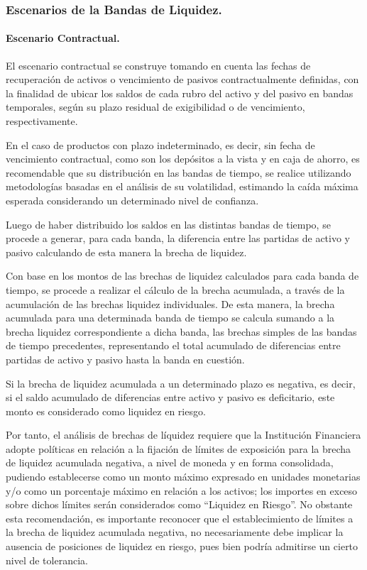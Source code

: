 \documentclass[10pt,]{article}
\begin{document}
\hypertarget{escenarios-de-la-bandas-de-liquidez.}{%
\subsubsection{Escenarios de la Bandas de
Liquidez.}\label{escenarios-de-la-bandas-de-liquidez.}}

\hypertarget{escenario-contractual.}{%
\paragraph{Escenario Contractual.}\label{escenario-contractual.}}

El escenario contractual se construye tomando en cuenta las fechas de
recuperación de activos o vencimiento de pasivos contractualmente
definidas, con la finalidad de ubicar los saldos de cada rubro del
activo y del pasivo en bandas temporales, según su plazo residual de
exigibilidad o de vencimiento, respectivamente.

En el caso de productos con plazo indeterminado, es decir, sin fecha de
vencimiento contractual, como son los depósitos a la vista y en caja de
ahorro, es recomendable que su distribución en las bandas de tiempo, se
realice utilizando metodologías basadas en el análisis de su
volatilidad, estimando la caída máxima esperada considerando un
determinado nivel de confianza.

Luego de haber distribuido los saldos en las distintas bandas de tiempo,
se procede a generar, para cada banda, la diferencia entre las partidas
de activo y pasivo calculando de esta manera la brecha de liquidez.

Con base en los montos de las brechas de liquidez calculados para cada
banda de tiempo, se procede a realizar el cálculo de la brecha
acumulada, a través de la acumulación de las brechas liquidez
individuales. De esta manera, la brecha acumulada para una determinada
banda de tiempo se calcula sumando a la brecha liquidez correspondiente
a dicha banda, las brechas simples de las bandas de tiempo precedentes,
representando el total acumulado de diferencias entre partidas de activo
y pasivo hasta la banda en cuestión.

Si la brecha de liquidez acumulada a un determinado plazo es negativa,
es decir, si el saldo acumulado de diferencias entre activo y pasivo es
deficitario, este monto es considerado como liquidez en riesgo.

Por tanto, el análisis de brechas de líquidez requiere que la
Institución Financiera adopte políticas en relación a la fijación de
límites de exposición para la brecha de liquidez acumulada negativa, a
nivel de moneda y en forma consolidada, pudiendo establecerse como un
monto máximo expresado en unidades monetarias y/o como un porcentaje
máximo en relación a los activos; los importes en exceso sobre dichos
límites serán considerados como ``Liquidez en Riesgo''. No obstante esta
recomendación, es importante reconocer que el establecimiento de límites
a la brecha de liquidez acumulada negativa, no necesariamente debe
implicar la ausencia de posiciones de liquidez en riesgo, pues bien
podría admitirse un cierto nivel de tolerancia.
\end{document}
